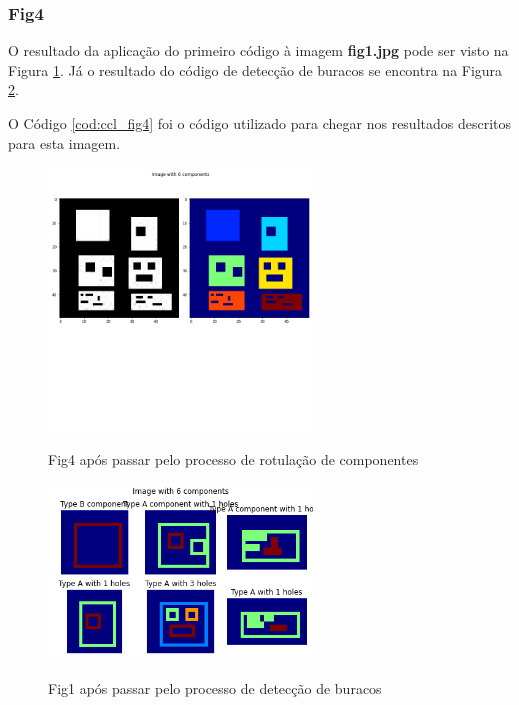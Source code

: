 \documentclass{article}
\begin{document}
\subsubsection{Fig4}
O resultado da aplicação do primeiro código à imagem \textbf{fig1.jpg} pode ser visto na Figura \ref{fig: ccl_fig4}. Já o resultado do código de detecção de buracos se encontra na Figura \ref{fig: hole_fig4}.  

O Código \ref{cod:ccl_fig4} foi o código utilizado para chegar nos resultados descritos para esta imagem.

\begin{figure}[!ht]
	\begin{minipage}[b]{1.0\linewidth}
		\centering
		\centerline{\includegraphics[width=7cm]{Figures/fig4.png}}
		\label{fig: ccl_fig4}
		\vspace{-2.0cm}
		\centerline{Fig4 após passar pelo processo de rotulação de componentes}\medskip	
	\end{minipage}
\end{figure}

\begin{figure}[!ht]
	\begin{minipage}[b]{1.0\linewidth}
		\centering
		\centerline{\includegraphics[width=7cm]{Figures/ccl_fig4.png}}
		\label{fig: hole_fig4}
		\centerline{Fig1 após passar pelo processo de detecção de buracos}\medskip	
	\end{minipage}
\end{figure}
\newpage
\onecolumn
\end{document}
